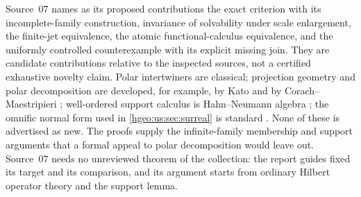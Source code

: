 \documentclass[11pt,letterpaper]{article}
\numberwithin{equation}{section}
\theoremstyle{definition}
\theoremstyle{remark}
\begin{document}
Source~07 names as its proposed contributions the exact criterion with its
incomplete-family construction, invariance of solvability under scale
enlargement, the finite-jet equivalence, the atomic functional-calculus
equivalence, and the uniformly controlled counterexample with its explicit
missing join. They are candidate contributions relative to the inspected
sources, not a certified exhaustive novelty claim. Polar intertwiners are
classical; projection geometry and polar decomposition are developed, for
example, by Kato and by Corach--Maestripieri \cite{Kato,CorachMaestripieri};
well-ordered support calculus is Hahn--Neumann algebra \cite{Neumann}; the
omnific normal form used in \cref{hgeo:us:sec:surreal} is standard
\cite{LInnocenteMantova}. None of these is advertised as new. The proofs
supply the infinite-family membership and support arguments that a formal
appeal to polar decomposition would leave out. Source~07 needs no unreviewed
theorem of the collection: the report guides fixed its target and its
comparison, and its argument starts from ordinary Hilbert operator theory and
the support lemma.
\end{document}
